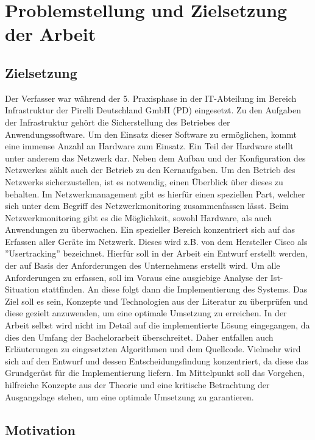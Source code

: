 \chapter{Problemstellung und Zielsetzung der Arbeit}
\label{cha:Einleitung}

\section{Zielsetzung}

Der Verfasser war während der 5. Praxisphase in der IT-Abteilung im Bereich Infrastruktur der Pirelli Deutschland GmbH (PD) eingesetzt.
Zu den Aufgaben der Infrastruktur gehört die Sicherstellung des Betriebes der Anwendungssoftware.
Um den Einsatz dieser Software zu ermöglichen, kommt eine immense Anzahl an Hardware zum Einsatz.
Ein Teil der Hardware stellt unter anderem das Netzwerk dar.
Neben dem Aufbau und der Konfiguration des Netzwerkes zählt auch der Betrieb zu den Kernaufgaben.
Um den Betrieb des Netzwerks sicherzustellen, ist es notwendig, einen Überblick über dieses zu behalten.
Im Netzwerkmanagement gibt es hierfür einen speziellen Part, welcher sich unter dem Begriff des Netzwerkmonitoring zusammenfassen lässt.
Beim Netzwerkmonitoring gibt es die Möglichkeit, sowohl Hardware, als auch Anwendungen zu überwachen.
Ein spezieller Bereich konzentriert sich auf das Erfassen aller Geräte im Netzwerk.
Dieses wird z.B. von dem Hersteller Cisco als ''Usertracking'' bezeichnet.
Hierfür soll in der Arbeit ein Entwurf erstellt werden, der auf Basis der Anforderungen des Unternehmens erstellt wird.
Um alle Anforderungen zu erfassen, soll im Voraus eine ausgiebige Analyse der Ist-Situation stattfinden.
An diese folgt dann die Implementierung des Systems.
Das Ziel soll es sein, Konzepte und Technologien aus der Literatur zu überprüfen und diese gezielt anzuwenden, um eine optimale Umsetzung zu erreichen. 
In der Arbeit selbst wird nicht im Detail auf die implementierte Lösung eingegangen, da dies den Umfang der Bachelorarbeit überschreitet.
Daher entfallen auch Erläuterungen zu eingesetzten Algorithmen und dem Quellcode.
Vielmehr wird sich auf den Entwurf und dessen Entscheidungsfindung konzentriert, da diese das Grundgerüst für die Implementierung liefern.
Im Mittelpunkt soll das Vorgehen, hilfreiche Konzepte aus der Theorie und eine kritische Betrachtung der Ausgangslage stehen, um eine optimale Umsetzung zu garantieren.\\


\section{Motivation}

